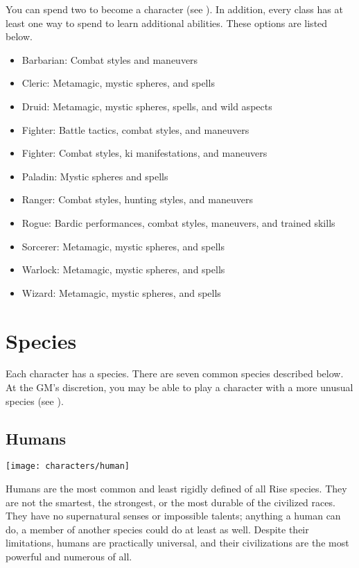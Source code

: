     You can spend two  to become a  character (see ).
    In addition, every class has at least one way to spend  to learn additional abilities.
    These options are listed below.
    \begin{itemize}
        \item Barbarian: Combat styles and maneuvers
        \item Cleric: Metamagic, mystic spheres, and spells
        \item Druid: Metamagic, mystic spheres, spells, and wild aspects
        \item Fighter: Battle tactics, combat styles, and maneuvers
        \item Fighter: Combat styles, ki manifestations, and maneuvers
        \item Paladin: Mystic spheres and spells
        \item Ranger: Combat styles, hunting styles, and maneuvers
        \item Rogue: Bardic performances, combat styles, maneuvers, and trained skills
        \item Sorcerer: Metamagic, mystic spheres, and spells
        \item Warlock: Metamagic, mystic spheres, and spells
        \item Wizard: Metamagic, mystic spheres, and spells
    \end{itemize}

\section{Species}\label{Species}
    Each character has a species.
    There are seven common species described below.
    At the GM's discretion, you may be able to play a character with a more unusual species (see ).

    \subsection{Humans}
        \texttt{[image: characters/human]}

        Humans are the most common and least rigidly defined of all Rise species.
        They are not the smartest, the strongest, or the most durable of the civilized races.
        They have no supernatural senses or impossible talents; anything a human can do, a member of another species could do at least as well.
        Despite their limitations, humans are practically universal, and their civilizations are the most powerful and numerous of all.

